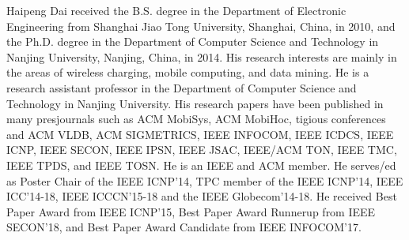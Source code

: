 \documentclass[10pt,journal,compsoc]{IEEEtran}
\begin{document}
\ifCLASSOPTIONcaptionsoff
  \newpage
\fi





\begin{IEEEbiography}{Haipeng Dai} 
received the B.S. degree in the Department of Electronic Engineering from Shanghai Jiao Tong University, Shanghai, China, in 2010, and the Ph.D. degree in the Department of Computer Science and Technology in Nanjing University, Nanjing, China, in 2014. His research interests are mainly in the areas of wireless charging, mobile computing, and data mining. He is a research assistant professor in the Department of Computer Science and Technology in Nanjing University. His research papers have been published in many presjournals such as ACM MobiSys, ACM MobiHoc, tigious conferences and ACM VLDB, ACM SIGMETRICS, IEEE INFOCOM, IEEE ICDCS, IEEE ICNP, IEEE SECON, IEEE IPSN, IEEE JSAC, IEEE/ACM TON, IEEE TMC, IEEE TPDS, and IEEE TOSN. He is an IEEE and ACM member. He serves/ed as Poster Chair of the IEEE ICNP'14, TPC member of the IEEE ICNP'14, IEEE ICC'14-18, IEEE ICCCN'15-18 and the IEEE Globecom'14-18. He received Best Paper Award from IEEE ICNP'15, Best Paper Award Runnerup from IEEE SECON'18, and Best Paper Award Candidate from IEEE INFOCOM'17.
\end{IEEEbiography}
\end{document}
